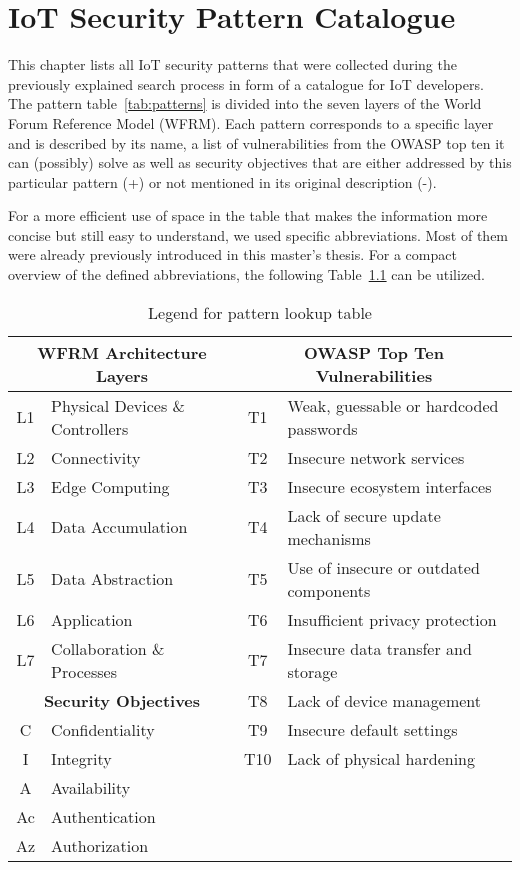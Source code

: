 
\chapter{IoT Security Pattern Catalogue}\label{ch:catalogue}
This chapter lists all IoT security patterns that were collected during the previously explained search process in form of a catalogue for IoT developers. The pattern table~\ref{tab:patterns} is divided into the seven layers of the World Forum Reference Model (WFRM). Each pattern corresponds to a specific layer and is described by its name, a list of vulnerabilities from the OWASP top ten it can (possibly) solve as well as security objectives that are either addressed by this particular pattern (+) or not mentioned in its original description (-).

For a more efficient use of space in the table that makes the information more concise but still easy to understand, we used specific abbreviations. Most of them were already previously introduced in this master's thesis. For a compact overview of the defined abbreviations, the following Table~\ref{tab:key} can be utilized.

\begin{longtable}[c]{|cl|cl|}
	\caption{Legend for pattern lookup table}
	\label{tab:key}\\
	\hline
	\multicolumn{2}{|c|}{\textbf{WFRM Architecture Layers}} & \multicolumn{2}{|c|}{\textbf{OWASP Top Ten Vulnerabilities}}\\
	\hline
	\endhead
	L1 & Physical Devices \& Controllers & T1 & Weak, guessable or hardcoded passwords \\
	L2 & Connectivity & T2 & Insecure network services \\
	L3 & Edge Computing & T3 & Insecure ecosystem interfaces \\
	L4 & Data Accumulation & T4 & Lack of secure update mechanisms \\
	L5 & Data Abstraction & T5 & Use of insecure or outdated components \\ 
	L6 & Application & T6 & Insufficient privacy protection \\
	L7 & Collaboration \& Processes & T7 & Insecure data transfer and storage \\ 
	\cline{1-2}
	\multicolumn{2}{|c|}{\textbf{Security Objectives}} & T8 & Lack of device management\\
	\cline{1-2}
	C & Confidentiality & T9 & Insecure default settings  \\
	I & Integrity & T10 & Lack of physical hardening \\
	A & Availability & & \\
	Ac & Authentication & & \\
	Az & Authorization & & \\
	\hline 
\end{longtable}


